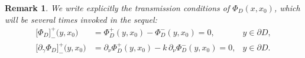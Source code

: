 \documentclass[10pt, a4paper, twoside, openright]{book}
\theoremstyle{definition}
\theoremstyle{plain}
\theoremstyle{plain}
\theoremstyle{plain}
\theoremstyle{plain}
\newtheorem{remark}[subsection]{Remark}
\theoremstyle{plain}
\theoremstyle{plain}
\theoremstyle{plain}
\theoremstyle{plain}
\begin{document}
\begin{remark}
 We write explicitly the transmission conditions of $\Phi_D(x,x_0)$, which will be several times invoked in the sequel:
\begin{subequations}
\begin{align}
 \bigl[\Phi_D\bigr]^+_-\bigl(y,x_0\bigr)&=\Phi_D^+(y,x_0) - \Phi_D^-(y,x_0) =0, & y \in\partial D, \label{eq:transmissionPhiD0}\\ 
 \bigl[\partial_\gamma \Phi_D\bigr]^+_-\bigl(y,x_0\bigr) &= \partial_\nu \Phi_D^+(y,x_0) - k\,\partial_\nu \Phi_D^-(y,x_0) =0, & y \in\partial D. \label{eq:transmissionPhiD1}
\end{align}
\end{subequations}
\end{remark}
\end{document}
